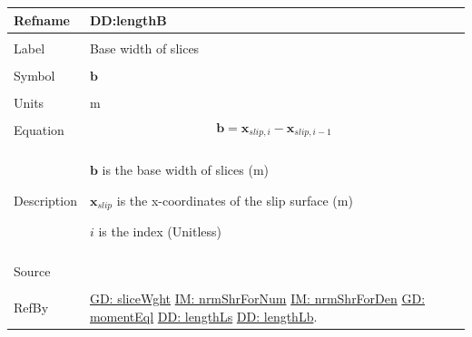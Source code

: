 \documentclass[12pt]{article}
\begin{document}
\noindent \begin{minipage}{\textwidth}
\begin{tabular}{p{} p{}}
\toprule \textbf{Refname} & \textbf{DD:lengthB}
\label{DD:lengthB}
\\ \midrule \\
Label & Base width of slices
\\ \midrule \\
Symbol & $\mathbf{b}$
\\ \midrule \\
Units & m
\\ \midrule \\
Equation & \begin{displaymath}
           \mathbf{b}={\mathbf{x}_{slip,i}}-{\mathbf{x}_{slip,i-1}}
           \end{displaymath}
\\ \midrule \\
Description & \begin{symbDescription}
              \item{$\mathbf{b}$ is the base width of slices (m)}
              \item{${\mathbf{x}_{slip}}$ is the x-coordinates of the slip surface (m)}
              \item{$i$ is the index (Unitless)}
              \end{symbDescription}
\\ \midrule \\
Source & \cite{fredlund1977}
\\ \midrule \\
RefBy & \hyperref[GD:sliceWght]{GD: sliceWght} \hyperref[IM:nrmShrForNum]{IM: nrmShrForNum} \hyperref[IM:nrmShrForDen]{IM: nrmShrForDen} \hyperref[GD:momentEql]{GD: momentEql} \hyperref[DD:lengthLs]{DD: lengthLs} \hyperref[DD:lengthLb]{DD: lengthLb}.
\\ \bottomrule \end{tabular}
\end{minipage}
\par~
\end{document}
